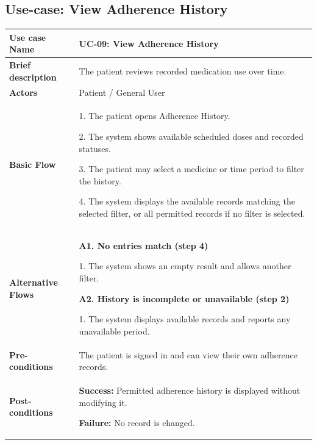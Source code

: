 \subsection{Use-case: View Adherence History}
\label{uc:uc-09}
\begin{longtable}{|p{}|p{}|}
\hline
\textbf{Use case Name} & UC-09: View Adherence History \\ \hline
\textbf{Brief description} & The patient reviews recorded medication use over time. \\ \hline
\textbf{Actors} & Patient / General User \\ \hline
\textbf{Basic Flow} &
1. The patient opens Adherence History.\par
2. The system shows available scheduled doses and recorded statuses.\par
3. The patient may select a medicine
or time period to filter the history.\par
4. The system displays the available
records matching the selected filter,
or all permitted records if no
filter is selected.
\\ \hline
\textbf{Alternative Flows} &
\textbf{A1. No entries match (step 4)}\par
1. The system shows an empty result and allows another filter.
\par\smallskip
\textbf{A2. History is incomplete or unavailable (step 2)}\par
1. The system displays available records and reports any unavailable period.
\\ \hline
\textbf{Pre-conditions} & The patient is signed in and can view their own adherence records. \\ \hline
\textbf{Post-conditions} & \textbf{Success:} Permitted adherence history is displayed without modifying it.\par
\textbf{Failure:} No record is changed. \\ \hline
\end{longtable}


